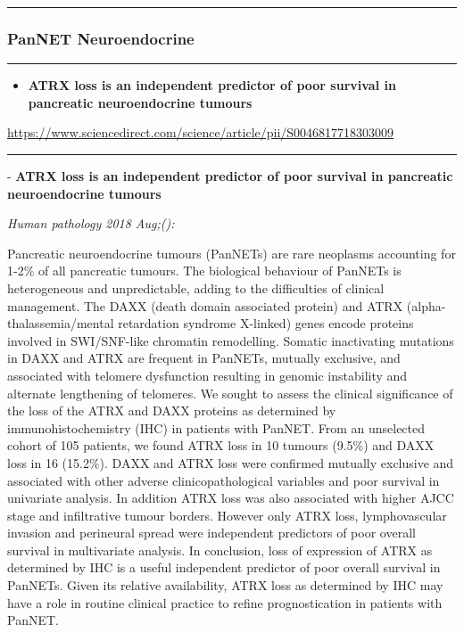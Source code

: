 \documentclass[]{article}
\providecommand{\tightlist}{%
  \setlength{\itemsep}{0pt}\setlength{\parskip}{0pt}}
\begin{document}
{}

{}

\begin{center}\rule{0.5\linewidth}{\linethickness}\end{center}

\hypertarget{pannet-neuroendocrine}{%
\subsubsection{PanNET Neuroendocrine}\label{pannet-neuroendocrine}}

\begin{center}\rule{0.5\linewidth}{\linethickness}\end{center}

\begin{itemize}
\tightlist
\item
  \textbf{ATRX loss is an independent predictor of poor survival in
  pancreatic neuroendocrine tumours}
\end{itemize}

\url{https://www.sciencedirect.com/science/article/pii/S0046817718303009}

\begin{center}\rule{0.5\linewidth}{\linethickness}\end{center}

 - \textbf{ATRX loss is an independent predictor of poor survival in
pancreatic neuroendocrine tumours}

\emph{Human pathology 2018 Aug;():}

Pancreatic neuroendocrine tumours (PanNETs) are rare neoplasms
accounting for 1-2\% of all pancreatic tumours. The biological behaviour
of PanNETs is heterogeneous and unpredictable, adding to the
difficulties of clinical management. The DAXX (death domain associated
protein) and ATRX (alpha-thalassemia/mental retardation syndrome
X-linked) genes encode proteins involved in SWI/SNF-like chromatin
remodelling. Somatic inactivating mutations in DAXX and ATRX are
frequent in PanNETs, mutually exclusive, and associated with telomere
dysfunction resulting in genomic instability and alternate lengthening
of telomeres. We sought to assess the clinical significance of the loss
of the ATRX and DAXX proteins as determined by immunohistochemistry
(IHC) in patients with PanNET. From an unselected cohort of 105
patients, we found ATRX loss in 10 tumours (9.5\%) and DAXX loss in 16
(15.2\%). DAXX and ATRX loss were confirmed mutually exclusive and
associated with other adverse clinicopathological variables and poor
survival in univariate analysis. In addition ATRX loss was also
associated with higher AJCC stage and infiltrative tumour borders.
However only ATRX loss, lymphovascular invasion and perineural spread
were independent predictors of poor overall survival in multivariate
analysis. In conclusion, loss of expression of ATRX as determined by IHC
is a useful independent predictor of poor overall survival in PanNETs.
Given its relative availability, ATRX loss as determined by IHC may have
a role in routine clinical practice to refine prognostication in
patients with PanNET.
\end{document}
